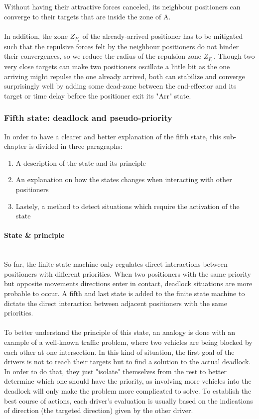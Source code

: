 \documentclass[]{spie}  %
\begin{document}
	Without having their attractive forces canceled, its neighbour positioners can converge to their targets that are inside the zone of A.\\\\
	In addition, the zone $Z_{F_{r}}$ of the already-arrived positioner has to be mitigated such that the repulsive forces felt by the neighbour positioners do not hinder their convergences, so we reduce the radius of the repulsion zone $Z_{F_{r}}$. Though two very close targets can make two positioners oscillate a little bit as the one arriving might repulse the one already arrived, both can stabilize and converge surprisingly well by adding some dead-zone between the end-effector and its target or time delay before the positioner exit its "Arr" state.  
	
	\subsubsection{Fifth state: deadlock and pseudo-priority}
	\label{sub_chapter_fifth_state}
	In order to have a clearer and better explanation of the fifth state, this sub-chapter is divided in three paragraphs: 
	\begin{enumerate}
		\item A description of the state and its principle 
		\item An explanation on how the states changes when interacting with other positioners
		\item Lastely, a method to detect situations which require the activation of the state
	\end{enumerate}
	
	\paragraph{State \& principle}\mbox{}\\
	So far, the finite state machine only regulates direct interactions between positioners with different priorities.
	When two positioners with the same priority but opposite movements directions enter in contact, deadlock situations are more probable to occur. A fifth and last state is added to the finite state machine to dictate the direct interaction between adjacent positioners with the same priorities.\\\\	
	To better understand the principle of this state, an analogy is done with an example of a well-known traffic problem, where two vehicles are being blocked by each other at one intersection. 
	In this kind of situation, the first goal of the drivers is not to reach their targets but to find a solution to the actual deadlock. In order to do that, they just "isolate" themselves from the rest to better determine which one should have the priority, as involving more vehicles into the deadlock will only make the problem more complicated to solve. To establish the best course of actions, each driver's evaluation is usually based on the indications of direction (the targeted direction) given by the other driver.\\
	
\end{document}
